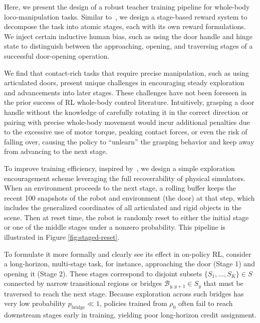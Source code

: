 Here, we present the design of a robust teacher training pipeline for whole-body loco-manipulation tasks. Similar to~\citet{wococo2024}, we design a stage-based reward system to decompose the task into atomic stages, each with its own reward formulations. We inject certain inductive human bias, such as using the door handle and hinge state to distinguish between the approaching, opening, and traversing stages of a successful door-opening operation.

We find that contact-rich tasks that require precise manipulation, such as using articulated doors, present unique challenges in encouraging steady exploration and advancements into later stages. These challenges have not been foreseen in the prior success of RL whole-body control literature. Intuitively, grasping a door handle without the knowledge of carefully rotating it in the correct direction or pairing with precise whole-body movement would incur additional penalties due to the excessive use of motor torque, peaking contact forces, or even the risk of falling over, causing the policy to ``unlearn'' the grasping behavior and keep away from advancing to the next stage.

To improve training efficiency, inspired by~\citet{first_return2021}, we design a simple exploration encouragement scheme leveraging the full recoverability of physical simulators. When an environment proceeds to the next stage, a rolling buffer keeps the recent 100 snapshots of the robot and environment (the door) at that step, which includes the generalized coordinates of all articulated and rigid objects in the scene. Then at reset time, the robot is randomly reset to either the initial stage or one of the middle stages under a nonzero probability. This pipeline is illustrated in Figure \ref{fig:staged-reset}.

To formulate it more formally and clearly see its effect in on-policy RL, consider a long-horizon, multi-stage task, for instance, approaching the door (Stage 1) and opening it (Stage 2). These stages correspond to disjoint subsets $\{S_1,\dots,S_K\} \in S$ connected by narrow transitional regions or bridges $\mathcal{B}_{y,y+1} \in S_y$ that must be traversed to reach the next stage. Because exploration across such bridges has very low probability $p_{\text{bridge}} \ll 1$, policies trained from $\rho_0$ often fail to reach downstream stages early in training, yielding poor long-horizon credit assignment.

